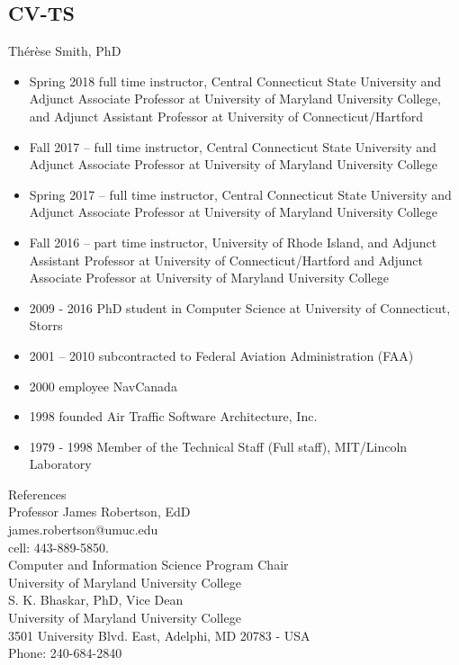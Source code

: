 \documentclass[]{article}
\begin{document}
 \subsection{CV-TS}
 Th\'er\`ese Smith, PhD
 \begin{itemize}
 	\item Spring 2018 full time instructor, Central Connecticut State University and Adjunct Associate Professor at University of Maryland University College, and Adjunct Assistant Professor at University of Connecticut/Hartford
 	\item Fall 2017 -- full time instructor, Central Connecticut State University and Adjunct Associate Professor at University of Maryland University College
 	\item Spring 2017 -- full time instructor, Central Connecticut State University and Adjunct Associate Professor at University of Maryland University College
 	\item	Fall 2016 -- part time instructor, University of Rhode Island, and Adjunct Assistant Professor at University of Connecticut/Hartford and Adjunct Associate Professor at University of Maryland University College
 	\item 2009 - 2016 PhD student in Computer Science at University of Connecticut, Storrs	
 	\item 2001 -- 2010 subcontracted to Federal Aviation Administration (FAA)
    \item 2000 employee NavCanada
    \item 1998 founded Air Traffic Software Architecture, Inc.
    \item 1979 - 1998 Member of the Technical Staff (Full staff), MIT/Lincoln Laboratory
\end{itemize}
 	
 	References\\
 	\noindent Professor James Robertson, EdD\\
 	james.robertson@umuc.edu \\
 	cell: 443-889-5850.\\
 	Computer and Information Science Program Chair\\
 	University of Maryland University College\\
 	S. K. Bhaskar, PhD, Vice Dean \\
 	University of Maryland University College\\
 	3501 University Blvd. East, Adelphi, MD 20783 - USA\\
 	Phone: 240-684-2840\\
 	
\end{document}
